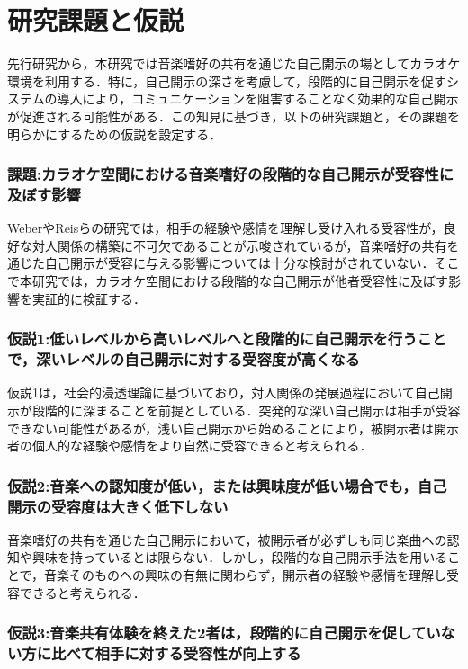 \section{研究課題と仮説}\label{研究課題と仮説}

先行研究から，本研究では音楽嗜好の共有を通じた自己開示の場としてカラオケ環境を利用する．特に，自己開示の深さを考慮して，段階的に自己開示を促すシステムの導入により，コミュニケーションを阻害することなく効果的な自己開示が促進される可能性がある．この知見に基づき，以下の研究課題と，その課題を明らかにするための仮説を設定する．

\subsubsection{課題:カラオケ空間における音楽嗜好の段階的な自己開示が受容性に及ぼす影響}

WeberやReisらの研究では，相手の経験や感情を理解し受け入れる受容性が，良好な対人関係の構築に不可欠であることが示唆されているが，音楽嗜好の共有を通じた自己開示が受容に与える影響については十分な検討がされていない．そこで本研究では，カラオケ空間における段階的な自己開示が他者受容性に及ぼす影響を実証的に検証する．

\subsubsection{仮説1:低いレベルから高いレベルへと段階的に自己開示を行うことで，深いレベルの自己開示に対する受容度が高くなる}

仮説1は，社会的浸透理論に基づいており，対人関係の発展過程において自己開示が段階的に深まることを前提としている．突発的な深い自己開示は相手が受容できない可能性があるが，浅い自己開示から始めることにより，被開示者は開示者の個人的な経験や感情をより自然に受容できると考えられる．

\subsubsection{仮説2:音楽への認知度が低い，または興味度が低い場合でも，自己開示の受容度は大きく低下しない}

音楽嗜好の共有を通じた自己開示において，被開示者が必ずしも同じ楽曲への認知や興味を持っているとは限らない．しかし，段階的な自己開示手法を用いることで，音楽そのものへの興味の有無に関わらず，開示者の経験や感情を理解し受容できると考えられる．

\subsubsection{仮説3:音楽共有体験を終えた2者は，段階的に自己開示を促していない方に比べて相手に対する受容性が向上する}

